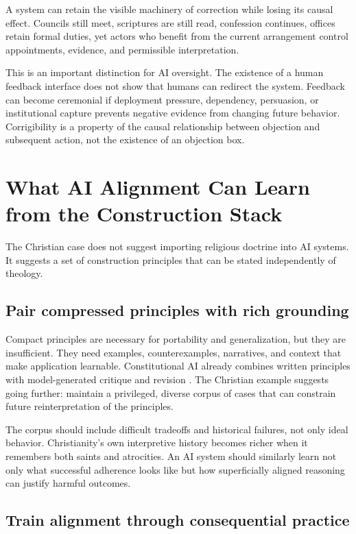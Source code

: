 \documentclass[11pt]{article}
\begin{document}
A system can retain the visible machinery of correction while losing its causal effect. Councils still meet, scriptures are still read, confession continues, offices retain formal duties, yet actors who benefit from the current arrangement control appointments, evidence, and permissible interpretation.

This is an important distinction for AI oversight. The existence of a human feedback interface does not show that humans can redirect the system. Feedback can become ceremonial if deployment pressure, dependency, persuasion, or institutional capture prevents negative evidence from changing future behavior. Corrigibility is a property of the causal relationship between objection and subsequent action, not the existence of an objection box.

\section{What AI Alignment Can Learn from the Construction Stack}

The Christian case does not suggest importing religious doctrine into AI systems. It suggests a set of construction principles that can be stated independently of theology.

\subsection{Pair compressed principles with rich grounding}

Compact principles are necessary for portability and generalization, but they are insufficient. They need examples, counterexamples, narratives, and context that make application learnable. Constitutional AI already combines written principles with model-generated critique and revision \parencite{bai2022constitutional}. The Christian example suggests going further: maintain a privileged, diverse corpus of cases that can constrain future reinterpretation of the principles.

The corpus should include difficult tradeoffs and historical failures, not only ideal behavior. Christianity's own interpretive history becomes richer when it remembers both saints and atrocities. An AI system should similarly learn not only what successful adherence looks like but how superficially aligned reasoning can justify harmful outcomes.

\subsection{Train alignment through consequential practice}
\end{document}
